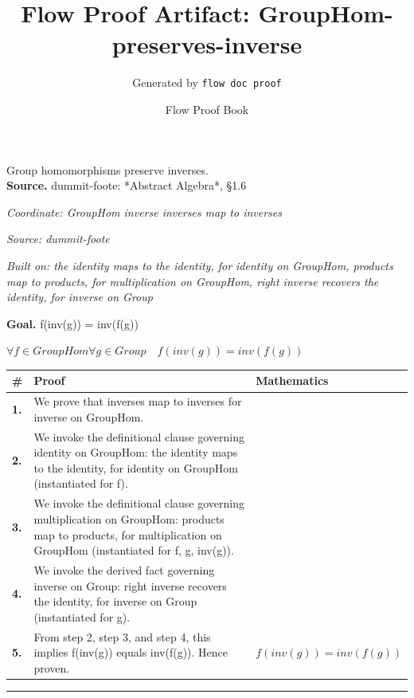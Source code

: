 \documentclass[11pt]{article}
\title{Flow Proof Artifact: GroupHom-preserves-inverse}
\author{Generated by \texttt{flow doc proof}}
\date{Flow Proof Book}
\theoremstyle{definition}
\begin{document}
\maketitle
Group homomorphisms preserve inverses.\\[0.5em]
\textbf{Source.} dummit-foote: *Abstract Algebra*, §1.6\\[0.5em]
\bigskip
{}\par
\smallskip\noindent\textit{Coordinate: GroupHom \cdot inverse \cdot inverses map to inverses}\par
\smallskip\noindent\textit{Source: dummit-foote}\par
\smallskip\noindent\textit{Built on: the identity maps to the identity, for identity on GroupHom, products map to products, for multiplication on GroupHom, right inverse recovers the identity, for inverse on Group}\par
\medskip
\noindent\textbf{Goal.} f(inv(g)) = inv(f(g))\par
\noindent$\displaystyle \forall f \in GroupHom \forall g \in Group\quad f(inv(g)) = inv(f(g))$\par
\medskip
\noindent
\begin{tabular}{@{} >{\raggedright\arraybackslash}p{} >{\raggedright\arraybackslash}p{} >{\raggedleft\arraybackslash}p{} @{}}
\textbf{\#} & \textbf{Proof} & \textbf{Mathematics} \\
\midrule
\textbf{1.} & We prove that inverses map to inverses for inverse on GroupHom. & \\[0.45em]
\textbf{2.} & We invoke the definitional clause governing identity on GroupHom: the identity maps to the identity, for identity on GroupHom (instantiated for f). & \\[0.45em]
\textbf{3.} & We invoke the definitional clause governing multiplication on GroupHom: products map to products, for multiplication on GroupHom (instantiated for f, g, inv(g)). & \\[0.45em]
\textbf{4.} & We invoke the derived fact governing inverse on Group: right inverse recovers the identity, for inverse on Group (instantiated for g). & \\[0.45em]
\textbf{5.} & From step 2, step 3, and step 4, this implies f(inv(g)) equals inv(f(g)). Hence proven. & $\displaystyle f(inv(g)) = inv(f(g))$ \\[0.45em]
\bottomrule
\end{tabular}
\label{thm:GroupHom-inverse-inverses_map_to_inverses}
\par\medskip\hrule
\end{document}
